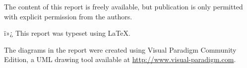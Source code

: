 \thispagestyle{empty}
{\small
\strut\vfill %

\noindent The content of this report is freely available, but publication is only permitted with explicit permission from the authors.
\vspace{0.2cm}

\noindent ï»¿ This report was typeset using \LaTeX.
\vspace{0.2cm}

\noindent The diagrams in the report were created using Visual Paradigm Community Edition, a UML drawing tool available at \url{http://www.visual-paradigm.com}.
}
\clearpage
